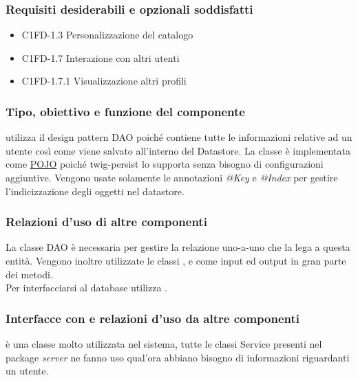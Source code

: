 \subsubsection*{Requisiti desiderabili e opzionali soddisfatti}
\begin{itemize}
    \item C1FD-1.3 Personalizzazione del catalogo
    \item C1FD-1.7 Interazione con altri utenti
    \item C1FD-1.7.1 Visualizzazione altri profili
\end{itemize}
\subsubsection*{Tipo, obiettivo e funzione del componente}
 utilizza il design pattern DAO poich\'e contiene tutte le
informazioni relative ad un utente cos\`i come viene salvato all'interno del
Datastore. La classe \`e implementata come \underline{POJO} poich\'e
twig-persist lo supporta senza bisogno di configurazioni aggiuntive. Vengono usate solamente
le annotazioni \emph{@Key} e \emph{@Index} per gestire l'indicizzazione
degli oggetti nel datastore.\\
\subsubsection*{Relazioni d'uso di altre componenti} La classe DAO  \`e necessaria per gestire la relazione
uno-a-uno che la lega a questa entit\`a. Vengono inoltre utilizzate le classi
,  e  come
input ed output in gran parte dei metodi.\\
Per interfacciarsi al database utilizza . 
\subsubsection*{Interfacce con e relazioni d'uso da altre componenti}
 \`e una classe molto utilizzata nel sistema, tutte le classi
Service presenti nel package \emph{server} ne fanno uso qual'ora abbiano bisogno
di informazioni riguardanti un utente. 
